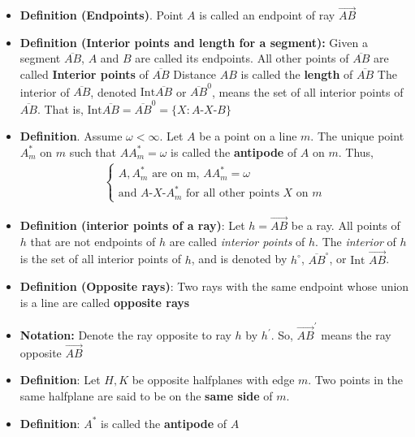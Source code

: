 \documentclass{report}
\begin{document}
    \pagebreak 
    \begin{itemize}
        \item \textbf{Definition (Endpoints)}. Point $A$ is called an endpoint of ray $\overrightarrow{AB} $
        \item \textbf{Definition (Interior points and length for a segment):} Given a segment $ \overline{AB}$, $A$ and $B$ are called its endpoints. All other points of $\overline{AB}$ are called \textbf{Interior points} of $\overline{AB}$
            \bigbreak \noindent 
            Distance $AB$ is called the \textbf{length} of $\overline{AB} $
            \bigbreak \noindent 
            The interior of $\overline{AB}$, denoted $\text{Int}\overline{AB}$ or $\overline{AB}^{0}$, means the set of all interior points of $\overline{AB}$. That is, $\text{Int}\overline{AB} = \overline{AB}^{0} = \{X: A\text{-}X\text{-}B\}$
        \item \textbf{Definition}. Assume $\omega < \infty$. Let $A$ be a point on a line $m$. The unique point $A_{m}^{*}$ on $m$ such that $AA_{m}^{*} = \omega$ is called the \textbf{antipode} of $A$ on $m$. Thus,
            \begin{align*}
                \begin{cases}
                    A,A_{m}^{*} \text{ are on m, }  AA_{m}^{*} = \omega \\
                    \text{and } A\text{-}X\text{-}A_{m}^{*} \text{ for all other points $X$ on $m$}
                \end{cases}
            \end{align*}
        \item \textbf{Definition (interior points of a ray)}: Let \( h = \overrightarrow{AB} \) be a ray.  
            All points of \( h \) that are not endpoints of \( h \) are called \textit{interior points} of \( h \).  
            \bigbreak \noindent 
            The \textit{interior} of \( h \) is the set of all interior points of \( h \),  
            and is denoted by \( h^\circ \), \( \overline{AB}^\circ \), or \( \text{Int } \overrightarrow{AB} \).
        \item \textbf{Definition (Opposite rays)}: Two rays with the same endpoint whose union is a line are called \textbf{opposite rays}
        \item \textbf{Notation:} Denote the ray opposite to ray $h$ by $h^{\prime}$. So, $\overrightarrow{AB}^{\prime}$ means the ray opposite $\overrightarrow{AB} $
        \item \textbf{Definition}: Let $H,K$ be opposite halfplanes with edge $m$. Two points in the same halfplane are said to be on the \textbf{same side} of $m$. 
        \item \textbf{Definition}: $A^{*} $ is called the \textbf{antipode} of $A$

    \end{itemize}
\end{document}
